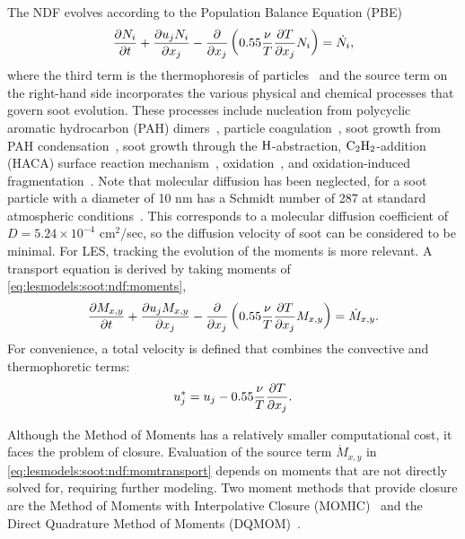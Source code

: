 The NDF evolves according to the Population Balance Equation (PBE)~\cite{friedlander2000}
\begin{equation}\label{eq:lesmodels:soot:ndf:pbe}
  \tder{N_i} - \pder[]{x_j}\left( 0.55\frac{\nu}{T}\pder[T]{x_j}N_i \right) = \dot{N_i},
\end{equation}
where the third term is the thermophoresis of particles~\cite{waldmann1966} and the source term on the right-hand side incorporates the various physical and chemical processes that govern soot evolution. These processes include nucleation from polycyclic aromatic hydrocarbon (PAH) dimers~\cite{blanquart2009,schuetz2002,frenklach1991,wang2011}, particle coagulation~\cite{kazakov1998,hmom2009}, soot growth from PAH condensation~\cite{blanquart2009,hmom2009}, soot growth through the $\ce{H}$-abstraction, $\ce{C2H2}$-addition (HACA) surface reaction mechanism~\cite{frenklach1985,frenklach1991}, oxidation~\cite{stanmore2001,neoh1981,kazakov1995}, and oxidation-induced fragmentation~\cite{neoh1984,mueller2011}. Note that molecular diffusion has been neglected, for a soot particle with a diameter of 10 nm has a Schmidt number of 287 at standard atmospheric conditions~\cite{friedlander2000}. This corresponds to a molecular diffusion coefficient of $D = 5.24\times 10^{-4}$ cm$^2$/sec, so the diffusion velocity of soot can be considered to be minimal. For LES, tracking the evolution of the moments is more relevant. A transport equation is derived by taking moments of \cref{eq:lesmodels:soot:ndf:moments},
\begin{equation}\label{eq:lesmodels:soot:ndf:momtransport}
  \tder{M_{x,y}} - \pder[]{x_j}\left( 0.55\frac{\nu}{T}\pder[T]{x_j}M_{x,y} \right) = \dot{M}_{x,y}.
\end{equation}
For convenience, a total velocity is defined that combines the convective and thermophoretic terms:
\begin{equation}\label{eq:lesmodels:soot:ndf:totvel}
  u_j^* = u_j - 0.55\frac{\nu}{T}\pder[T]{x_j}.
\end{equation}

Although the Method of Moments has a relatively smaller computational cost, it faces the problem of closure. Evaluation of the source term $\dot{M}_{x,y}$ in \cref{eq:lesmodels:soot:ndf:momtransport} depends on moments that are not directly solved for, requiring further modeling. Two moment methods that provide closure are the Method of Moments with Interpolative Closure (MOMIC)~\cite{frenklach2002,frenklach1987,frenklach1994} and the Direct Quadrature Method of Moments (DQMOM)~\cite{marchisio2005}.

